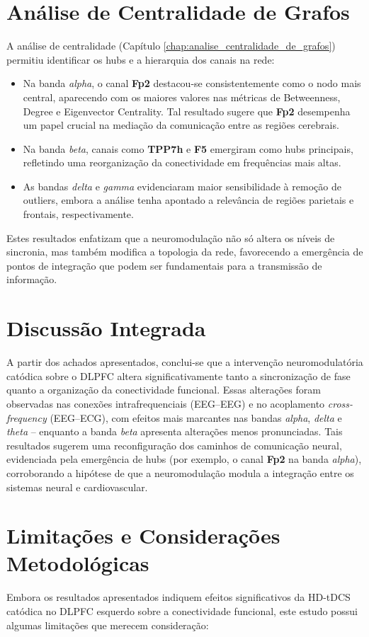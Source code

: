 \section{Análise de Centralidade de Grafos}
A análise de centralidade (Capítulo \ref{chap:analise_centralidade_de_grafos}) permitiu identificar os hubs e a hierarquia dos canais na rede:
\begin{itemize}
    \item Na banda \emph{alpha}, o canal \textbf{Fp2} destacou-se consistentemente como o nodo mais central, aparecendo com os maiores valores nas métricas de Betweenness, Degree e Eigenvector Centrality. Tal resultado sugere que \textbf{Fp2} desempenha um papel crucial na mediação da comunicação entre as regiões cerebrais.
    \item Na banda \emph{beta}, canais como \textbf{TPP7h} e \textbf{F5} emergiram como hubs principais, refletindo uma reorganização da conectividade em frequências mais altas.
    \item As bandas \emph{delta} e \emph{gamma} evidenciaram maior sensibilidade à remoção de outliers, embora a análise tenha apontado a relevância de regiões parietais e frontais, respectivamente.
\end{itemize}
Estes resultados enfatizam que a neuromodulação não só altera os níveis de sincronia, mas também modifica a topologia da rede, favorecendo a emergência de pontos de integração que podem ser fundamentais para a transmissão de informação.

\section{Discussão Integrada}
A partir dos achados apresentados, conclui-se que a intervenção neuromodulatória catódica sobre o DLPFC altera significativamente tanto a sincronização de fase quanto a organização da conectividade funcional. Essas alterações foram observadas nas conexões intrafrequenciais (EEG--EEG) e no acoplamento \textit{cross-frequency} (EEG--ECG), com efeitos mais marcantes nas bandas \emph{alpha}, \emph{delta} e \emph{theta} – enquanto a banda \emph{beta} apresenta alterações menos pronunciadas. Tais resultados sugerem uma reconfiguração dos caminhos de comunicação neural, evidenciada pela emergência de hubs (por exemplo, o canal \textbf{Fp2} na banda \emph{alpha}), corroborando a hipótese de que a neuromodulação modula a integração entre os sistemas neural e cardiovascular.


\section{Limitações e Considerações Metodológicas}
\label{sec:limitacoes}
Embora os resultados apresentados indiquem efeitos significativos da HD-tDCS catódica no DLPFC esquerdo sobre a conectividade funcional, este estudo possui algumas limitações que merecem consideração:

